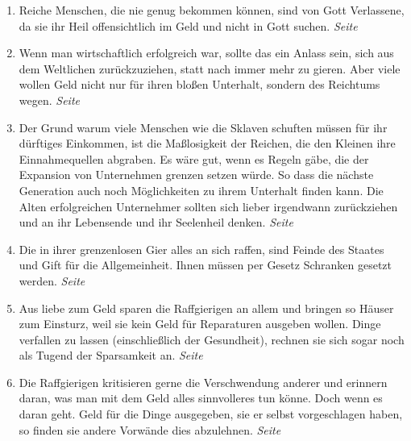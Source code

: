 \begin{enumerate}
 \item Reiche Menschen, die nie genug bekommen können, sind von Gott Verlassene,
da sie ihr Heil offensichtlich im Geld und nicht in Gott suchen.
 \dotfill \textit{Seite~\pageref{ref:13_06_reichtum_unersaettlichkeit}}\\

 \item Wenn man wirtschaftlich erfolgreich war, sollte das ein Anlass sein, sich
aus dem Weltlichen zurückzuziehen, statt nach immer mehr zu gieren. Aber viele
wollen Geld nicht nur für ihren bloßen Unterhalt, sondern des Reichtums wegen.
 \dotfill \textit{Seite~\pageref{ref:13_07_reichtum_genuegsamkeit}}\\

 \item Der Grund warum viele Menschen wie die Sklaven schuften müssen für ihr
dürftiges Einkommen, ist die Maßlosigkeit der Reichen, die den Kleinen ihre
Einnahmequellen abgraben. Es wäre gut, wenn es Regeln gäbe, die der Expansion
von Unternehmen grenzen setzen würde. So dass die nächste Generation
auch noch Möglichkeiten zu ihrem Unterhalt finden kann. Die Alten
erfolgreichen Unternehmer sollten sich lieber irgendwann zurückziehen und an
ihr Lebensende und ihr Seelenheil denken.
 \dotfill \textit{Seite~\pageref{ref:13_08_reichtum_sklaverei}}\\

 \item Die in ihrer grenzenlosen Gier alles an sich raffen, sind Feinde des
Staates und Gift für die Allgemeinheit. Ihnen müssen per Gesetz Schranken gesetzt
werden.
 \dotfill \textit{Seite~\pageref{ref:13_14_reichtum_schaden}}\\

 \item Aus liebe zum Geld sparen die Raffgierigen an allem und bringen so
Häuser zum Einsturz, weil sie kein Geld für Reparaturen ausgeben wollen. Dinge
verfallen zu lassen (einschließlich der Gesundheit), rechnen sie sich sogar
noch als Tugend der Sparsamkeit an.
 \dotfill \textit{Seite~\pageref{ref:13_14_reichtum_einsturz}}\\

 \item Die Raffgierigen kritisieren gerne die Verschwendung anderer und
 erinnern daran, was man mit dem Geld alles sinnvolleres tun könne. Doch
 wenn es daran geht. Geld für die Dinge ausgegeben, sie er selbst vorgeschlagen
 haben, so finden sie andere Vorwände dies abzulehnen.
 \dotfill \textit{Seite~\pageref{ref:13_15_Kapitalisten_kritik}}\\


\end{enumerate}
